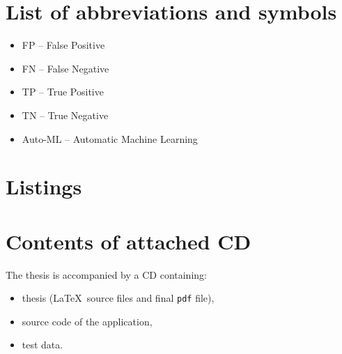 \documentclass[a4paper,twoside,12pt]{book}
\newcounter{PagesWithoutNumbers}
\begin{document}
\backmatter
{}
\setcounter{page}{\value{PagesWithoutNumbers}}

\pagestyle{onlyPageNumbers}





\begin{appendices}




\chapter*{List of abbreviations and symbols}


\begin{itemize}
   
 \item  FP -- False Positive

 \item  FN -- False Negative

 \item  TP -- True Positive

 \item  TN -- True Negative

 \item  Auto-ML -- Automatic Machine Learning

\end{itemize}

\chapter*{Listings}
\label{lst:pipeline}


\chapter*{Contents of attached CD}

The thesis is accompanied by a CD containing:
\begin{itemize}
\item thesis (\LaTeX\ source files and final \texttt{pdf} file),
\item source code of the application,
\item test data.
\end{itemize}


\listoffigures
\listoftables
	
\end{appendices}
\end{document}
